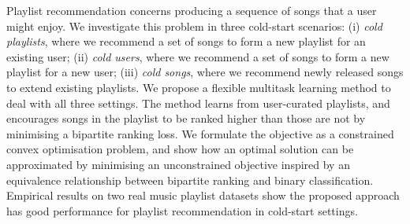 
Playlist recommendation concerns producing a sequence of songs that a user might enjoy.
We investigate this problem in three %
cold-start scenarios:
(i) \emph{cold playlists}, where we recommend a set of songs to form a new playlist for an existing user; %
(ii) \emph{cold users}, where we recommend a set of songs to form a new playlist for a new user; %
(iii) \emph{cold songs}, where we recommend newly released songs to extend existing playlists.
%
We propose a flexible multitask learning method to deal with all three settings.
The method learns from user-curated playlists,
and encourages songs in the playlist 
to be ranked higher than those are not
by minimising a %
bipartite ranking loss.
We formulate the objective as a constrained convex optimisation problem,
and show how an optimal solution can be approximated by minimising an unconstrained objective
inspired by an equivalence relationship between bipartite ranking and binary classification.
Empirical results on two real music playlist datasets show the proposed approach has good performance for playlist recommendation
in cold-start settings.
